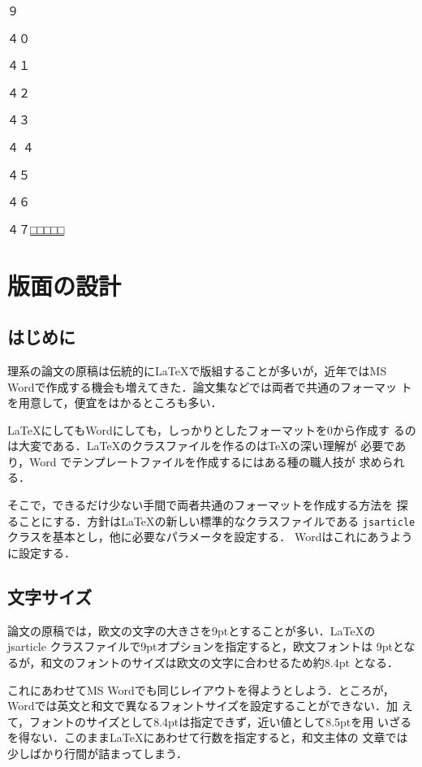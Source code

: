 \documentclass[a4j, 12Q, twocolumn, twoside]{jsarticle}
\begin{document}
９\par \noindent ４０\par
\noindent ４１\par \noindent ４２\par \noindent ４３\par \noindent ４
４\par \noindent ４５\par
\noindent ４６\par \noindent ４７\underline{□□□□□}\par

\newpage

\section{版面の設計}
\subsection{はじめに}
  理系の論文の原稿は伝統的に\LaTeX で版組することが多いが，近年ではMS
  Wordで作成する機会も増えてきた．論文集などでは両者で共通のフォーマッ
  トを用意して，便宜をはかるところも多い．

  \LaTeX にしてもWordにしても，しっかりとしたフォーマットを0から作成す
  るのは大変である．\LaTeX のクラスファイルを作るのは\TeX の深い理解が
  必要であり，Word でテンプレートファイルを作成するにはある種の職人技が
  求められる．

  そこで，できるだけ少ない手間で両者共通のフォーマットを作成する方法を
  探ることにする．方針は\LaTeX の新しい標準的なクラスファイルである
  \texttt{jsarticle}クラスを基本とし，他に必要なパラメータを設定する．
  Wordはこれにあうように設定する．

\subsection{文字サイズ}

  論文の原稿では，欧文の文字の大きさを9ptとすることが多い．\LaTeX の
  jsarticle クラスファイルで9ptオプションを指定すると，欧文フォントは
  9ptとなるが，和文のフォントのサイズは欧文の文字に合わせるため約8.4pt
  となる．

  これにあわせてMS Wordでも同じレイアウトを得ようとしよう．ところが，
  Wordでは英文と和文で異なるフォントサイズを設定することができない．加
  えて，フォントのサイズとして8.4ptは指定できず，近い値として8.5ptを用
  いざるを得ない．このまま\LaTeX にあわせて行数を指定すると，和文主体の
  文章では少しばかり行間が詰まってしまう．
\end{document}

